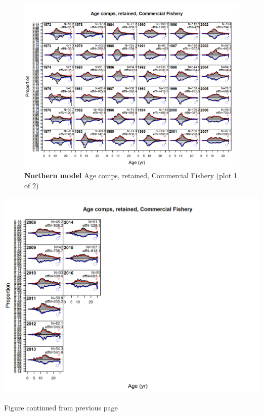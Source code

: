 \documentclass[12pt,]{article}
\begin{document}
\begin{figure}[htbp]
\centering
\includegraphics{./r4ss/plots_mod1/comp_agefit_flt1mkt2_page1.png}
\caption{\textbf{Northern model} Age comps, retained, Commercial Fishery
(plot 1 of 2) \label{fig:mod1_1_comp_agefit_flt1mkt2_page1}}
\end{figure}

\includegraphics{./r4ss/plots_mod1/comp_agefit_flt1mkt2_page2.png}

\begin{center} 

            Figure continued from previous page 

            \end{center}
\end{document}
